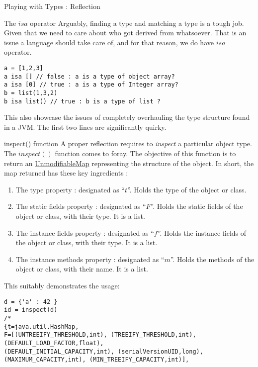 \begin{section}{Playing with Types : Reflection}
\begin{subsection}{The $isa$ operator}
Arguably, finding a type and matching a type is a tough job.
Given that we need to care about who got derived from whatsoever.
That is an issue a language should take care of, and for that reason, 
we do have $isa$ operator.

\begin{lstlisting}[style=JexlStyle]
a = [1,2,3] 
a isa [] // false : a is a type of object array?
a isa [0] // true : a is a type of Integer array?
b = list(1,3,2)
b isa list() // true : b is a type of list ? 
\end{lstlisting}
This also showcase the issues of completely overhauling the type 
structure found in a JVM. The first two lines are significantly quirky.

\end{subsection}

\begin{subsection}{inspect() function}
A proper reflection requires to \emph{inspect} a particular object type.
The $inspect()$ function comes to foray. The objective of this function 
is to return an \href{https://docs.oracle.com/javase/8/docs/api/java/util/Collections.html#unmodifiableMap-java.util.Map-}{UnmodifiableMap} 
representing the structure of the object. In short, the map returned has these key ingredients :

\begin{enumerate}
\item{The type property : designated as ``$t$''.  Holds the type of the object or class. }
\item{The static fields property : designated as ``$F$''.  
        Holds the static fields of the object or class, with their type. It is a list.}
\item{The instance fields property : designated as ``$f$''.  
        Holds the instance fields of the object or class, with their type. It is a list.}
\item{The instance methods property : designated as ``$m$''.  
        Holds the methods of the object or class, with their name. It is a list.}
\end{enumerate}

This suitably demonstrates the usage:
\begin{center}\begin{minipage}{\linewidth}
\begin{lstlisting}[style=JexlStyle]
d = {'a' : 42 }
id = inspect(d)
/*
{t=java.util.HashMap, 
F=[(UNTREEIFY_THRESHOLD,int), (TREEIFY_THRESHOLD,int), 
(DEFAULT_LOAD_FACTOR,float), 
(DEFAULT_INITIAL_CAPACITY,int), (serialVersionUID,long), 
(MAXIMUM_CAPACITY,int), (MIN_TREEIFY_CAPACITY,int)], 


\end{lstlisting}
\end{minipage}
\end{center}
\end{subsection}
\end{section}
